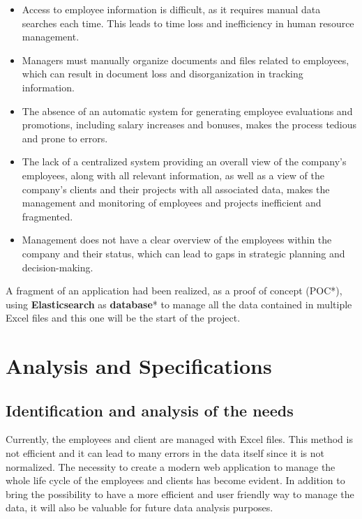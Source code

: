 \documentclass[12pt,a4paper,table,english]{article}
\begin{document}
	\begin{itemize}
	
		\item Access to employee information is difficult, as it requires manual data searches each time. This leads to time loss and inefficiency in human resource management.
	
		\item Managers must manually organize documents and files related to employees, which can result in document loss and disorganization in tracking information.
	
		\item The absence of an automatic system for generating employee evaluations and promotions, including salary increases and bonuses, makes the process tedious and prone to errors.
	
		\item The lack of a centralized system providing an overall view of the company’s employees, along with all relevant information, as well as a view of the company’s clients and their projects with all associated data, makes the management and monitoring of employees and projects inefficient and fragmented.
	
		\item Management does not have a clear overview of the employees within the company and their status, which can lead to gaps in strategic planning and decision-making.
	
	\end{itemize}


	A fragment of an application had been realized, as a proof of concept (POC*), using \textbf{Elasticsearch} as \textbf{database}* to manage all the data contained in multiple Excel files and this one will be the start of the project.\\
	
	\newpage
	
	
	\section{Analysis and Specifications}
	
	\subsection{Identification and analysis of the needs}
	Currently, the employees and client are managed with Excel files. This method is not efficient and it can lead to many errors in the data itself since it is not normalized. The necessity to create a modern web application to manage the whole life cycle of the employees and clients has become evident. In addition to bring the possibility to have a more efficient and user friendly way to manage the data, it will also be valuable for future data analysis purposes.\\
	
\end{document}
